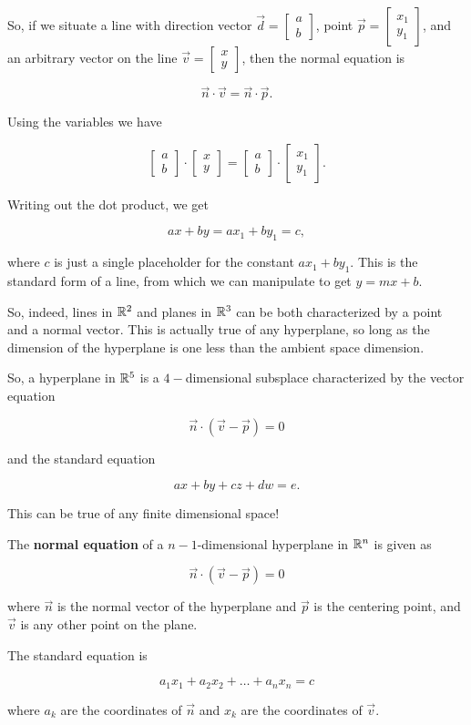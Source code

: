\documentclass{ximera}
\begin{document}
So, if we situate a line with direction vector $\vec{d}=\begin{bmatrix}
  a\\b
\end{bmatrix}$, point $\vec{p}=\begin{bmatrix}
  x_1\\y_1
\end{bmatrix}$, and an arbitrary vector on the line $\vec{v}=\begin{bmatrix}
  x\\y
\end{bmatrix}$, then the normal equation is

$$\vec{n}\cdot \vec{v}=\vec{n}\cdot\vec{p}.$$

Using the variables we have 

$$\begin{bmatrix}
  a\\b
\end{bmatrix}\cdot \begin{bmatrix}
  x\\y
\end{bmatrix}=\begin{bmatrix}
  a\\b
\end{bmatrix}\cdot\begin{bmatrix}
  x_1\\y_1
\end{bmatrix}.$$

Writing out the dot product, we get

$$ax+by=ax_1+by_1=c,$$

where $c$ is just a single placeholder for the constant $ax_1+by_1$. This is the standard form of a line, from which we can manipulate to get $y=mx+b$.

So, indeed, lines in $\mathbb{R}^2$ and planes in $\mathbb{R}^3$ can be both characterized by a point and a normal vector. This is actually true of any hyperplane, so long as the dimension of the hyperplane is one less than the ambient space dimension.

So, a hyperplane in $\mathbb{R}^5$ is a $4-$dimensional subsplace characterized by the vector equation

$$\vec{n}\cdot(\vec{v}-\vec{p})=0$$

and the standard equation

$$ax+by+cz+dw=e.$$

This can be true of any finite dimensional space!

\begin{definition}
  The {\bf normal equation} of a $n-1$-dimensional hyperplane in $\mathbb{R}^n$ is given as

  $$\vec{n}\cdot(\vec{v}-\vec{p})=0$$

  where $\vec{n}$ is the normal vector of the hyperplane and $\vec{p}$ is the centering point, and $\vec{v}$ is any other point on the plane.

  The standard equation is 

  $$a_1x_1+a_2x_2+\ldots+a_nx_n=c$$

  where $a_k$ are the coordinates of $\vec{n}$ and $x_k$ are the coordinates of $\vec{v}$.
\end{definition}
\end{document}
